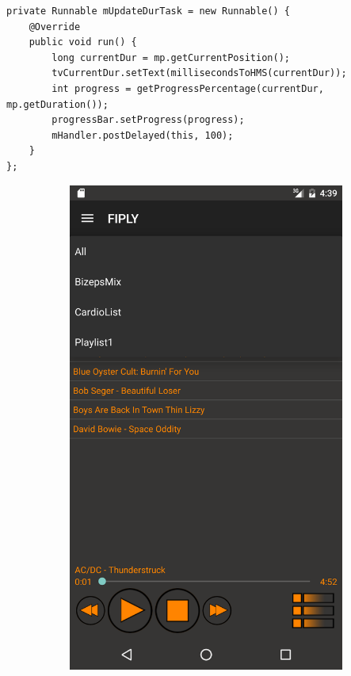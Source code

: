 \documentclass[FIPLY_base.tex]{subfiles}
\begin{document}
\begin{lstlisting}
private Runnable mUpdateDurTask = new Runnable() {
    @Override
    public void run() {
        long currentDur = mp.getCurrentPosition();
        tvCurrentDur.setText(millisecondsToHMS(currentDur));
        int progress = getProgressPercentage(currentDur, mp.getDuration());
        progressBar.setProgress(progress);
        mHandler.postDelayed(this, 100);
    }
};
\end{lstlisting}

\begin{figure}[h]
	\begin{subfigure}[b]{0.3\textwidth}
	\includegraphics[scale=0.17]{img/musicListenView1}

\end{subfigure}
\end{figure}
\end{document}
